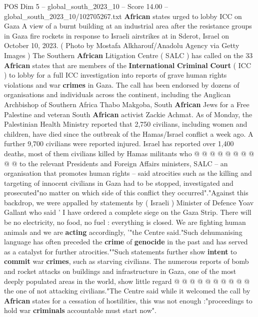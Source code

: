 \begin{textsample}{POS Dim 5 – global\_south\_2023\_10 – Score 14.00 – global\_south\_2023\_10/102705267.txt}  \label{ex:f5_pos_386}
\textbf{African} states urged to lobby ICC on Gaza A view of a burnt building at an industrial area after the resistance groups in Gaza fire rockets in response to Israeli airstrikes at in Sderot, Israel on October 10, 2023. ( Photo by Mostafa Alkharouf/Anadolu Agency via Getty Images ) The Southern \textbf{African} Litigation Centre ( SALC ) has called on the 33 \textbf{African} states that are members of the \textbf{International} \textbf{Criminal} \textbf{Court} ( ICC ) to lobby for a full ICC investigation into reports of grave human rights violations and war \textbf{crimes} in Gaza.
The call has been endorsed by dozens of organisations and individuals across the continent, including the Anglican Archbishop of Southern Africa Thabo Makgoba, South \textbf{African} Jews for a Free Palestine and veteran South \textbf{African} activist Zackie Achmat.
As of Monday, the Palestinian Health Ministry reported that 2,750 civilians, including women and children, have died since the outbreak of the Hamas/Israel conflict a week ago.
A further 9,700 civilians were reported injured.
Israel has reported over 1,400 deaths, most of them civilians killed by Hamas militants who @ @ @ @ @ @ @ @ @ @ to the relevant Presidents and Foreign Affairs ministers, SALC -- an organisation that promotes human rights -- said atrocities such as the killing and targeting of innocent civilians in Gaza had to be stopped, investigated and prosecuted"no matter on which side of this conflict they occurred"."Against this backdrop, we were appalled by statements by ( Israeli ) Minister of Defence Yoav Gallant who said ' I have ordered a complete siege on the Gaza Strip.
There will be no electricity, no food, no fuel : everything is closed.
We are fighting human animals and we are \textbf{acting} accordingly, '"the Centre said."Such dehumanising language has often preceded the \textbf{crime} of \textbf{genocide} in the past and has served as a catalyst for further atrocities.""Such statements further show \textbf{intent} to \textbf{commit} war \textbf{crimes}, such as starving civilians.
The numerous reports of bomb and rocket attacks on buildings and infrastructure in Gaza, one of the most deeply populated areas in the world, show little regard @ @ @ @ @ @ @ @ @ @ the one of not attacking civilians."The Centre said while it welcomed the call by \textbf{African} states for a cessation of hostilities, this was not enough :"proceedings to hold war \textbf{criminals} accountable must start now".

\end{textsample}
